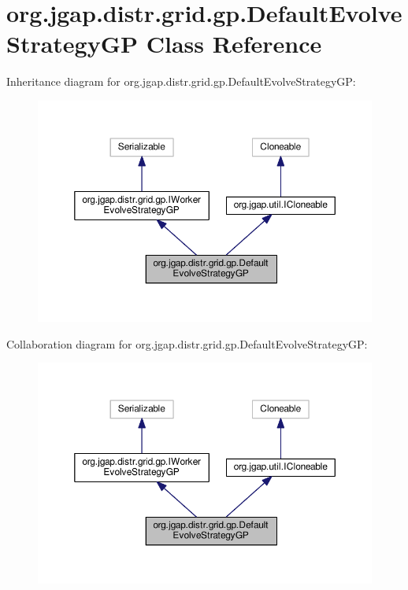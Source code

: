 \hypertarget{classorg_1_1jgap_1_1distr_1_1grid_1_1gp_1_1_default_evolve_strategy_g_p}{\section{org.\-jgap.\-distr.\-grid.\-gp.\-Default\-Evolve\-Strategy\-G\-P Class Reference}
\label{classorg_1_1jgap_1_1distr_1_1grid_1_1gp_1_1_default_evolve_strategy_g_p}
}


Inheritance diagram for org.\-jgap.\-distr.\-grid.\-gp.\-Default\-Evolve\-Strategy\-G\-P\-:
\nopagebreak
\begin{figure}[H]
\begin{center}
\leavevmode
\includegraphics[width=350pt]{classorg_1_1jgap_1_1distr_1_1grid_1_1gp_1_1_default_evolve_strategy_g_p__inherit__graph}
\end{center}
\end{figure}


Collaboration diagram for org.\-jgap.\-distr.\-grid.\-gp.\-Default\-Evolve\-Strategy\-G\-P\-:
\nopagebreak
\begin{figure}[H]
\begin{center}
\leavevmode
\includegraphics[width=350pt]{classorg_1_1jgap_1_1distr_1_1grid_1_1gp_1_1_default_evolve_strategy_g_p__coll__graph}
\end{center}
\end{figure}
